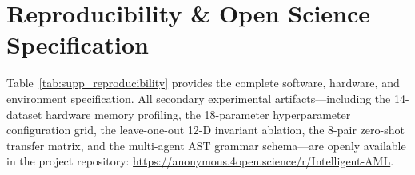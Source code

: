 \documentclass[a4paper,fleqn,twocolumn]{article}
\renewcommand{\arraystretch}{0.88}
\begin{document}
\begin{table}[htbp]
\centering
\caption{Regulatory Escalation Mapping across Conformal Triage Tiers.}
\label{tab:supp_governance_sop}
\renewcommand{\arraystretch}{0.84}
\end{table}

\section{Reproducibility \& Open Science Specification}
\label{sec:reproducibility_checklist}

Table~\ref{tab:supp_reproducibility} provides the complete software, hardware, and environment specification. All secondary experimental artifacts---including the 14-dataset hardware memory profiling, the 18-parameter hyperparameter configuration grid, the leave-one-out 12-D invariant ablation, the 8-pair zero-shot transfer matrix, and the multi-agent AST grammar schema---are openly available in the project repository: \url{https://anonymous.4open.science/r/Intelligent-AML}.
\end{document}
